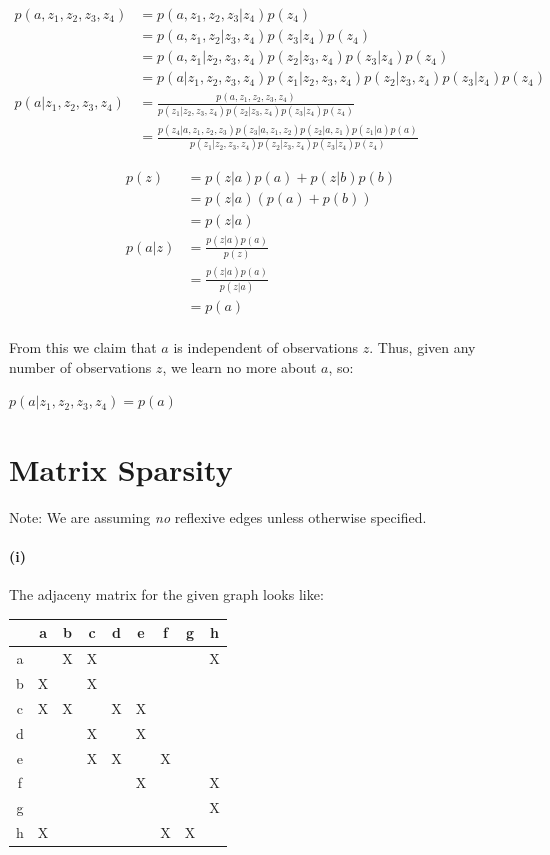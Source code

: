 \documentclass[12pt]{article}
\begin{document}
\begin{enumerate}
\begin{align*}
	p(a,z_1,z_2,z_3,z_4) &= p(a,z_1,z_2,z_3|z_4)p(z_4) \\
					  &=  p(a,z_1,z_2|z_3,z_4)p(z_3|z_4)p(z_4) \\
					  &=  p(a,z_1|z_2,z_3,z_4)p(z_2|z_3,z_4)p(z_3|z_4)p(z_4) \\
					  &=  p(a|z_1,z_2,z_3,z_4)p(z_1|z_2,z_3,z_4)p(z_2|z_3,z_4)p(z_3|z_4)p(z_4) \\
	p(a|z_1,z_2,z_3,z_4) &=	\frac{p(a,z_1,z_2,z_3,z_4)}{p(z_1|z_2,z_3,z_4)p(z_2|z_3,z_4)p(z_3|z_4)p(z_4)} \\
	 				  &=  \frac{p(z_4|a,z_1,z_2,z_3)p(z_3|a,z_1,z_2)p(z_2|a,z_1)p(z_1|a)p(a)}{p(z_1|z_2,z_3,z_4)p(z_2|z_3,z_4)p(z_3|z_4)p(z_4)}
	\end{align*}

    \begin{align*}
    p(z) &= p(z|a)p(a) + p(z|b)p(b) \\
        &= p(z|a)(p(a) + p(b)) \\
        &= p(z|a) \\
    p(a|z) &= \frac{p(z|a)p(a)}{p(z)} \\
        &= \frac{p(z|a)p(a)}{p(z|a)} \\
        &= p(a) \\
    \end{align*}

    From this we claim that $a$ is independent of observations $z$. Thus, given
    any number of observations $z$, we learn no more about $a$, so:

    $p(a|z_1,z_2,z_3,z_4) = p(a)$
\end{enumerate}

\pagebreak

\section{Matrix Sparsity}

Note: We are assuming \emph{no} reflexive edges unless otherwise specified.
\paragraph{(i)}
The adjaceny matrix for the given graph looks like:

\begin{tabular}{| c || c | c | c | c | c | c | c | c |}
\hline
& a & b & c & d & e & f & g & h \\
\hline \hline
a & & X & X & & & & & X \\
\hline
b & X & & X & & & & & \\
\hline
c & X & X & & X & X & & & \\
\hline
d & & & X & & X & & & \\
\hline
e & & & X & X & & X & & \\
\hline
f & & & & & X & & & X  \\
\hline
g & & & & & & & & X \\
\hline
h & X & & & & & X & X & \\
\hline
\end{tabular}
\end{document}
